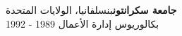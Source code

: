 \textbf{جامعة سكرانتون}\hfill بنسلفانيا، الولايات المتحدة\\
بكالوريوس إدارة الأعمال \hfill 1989 - 1992\\
\vspace{2mm}